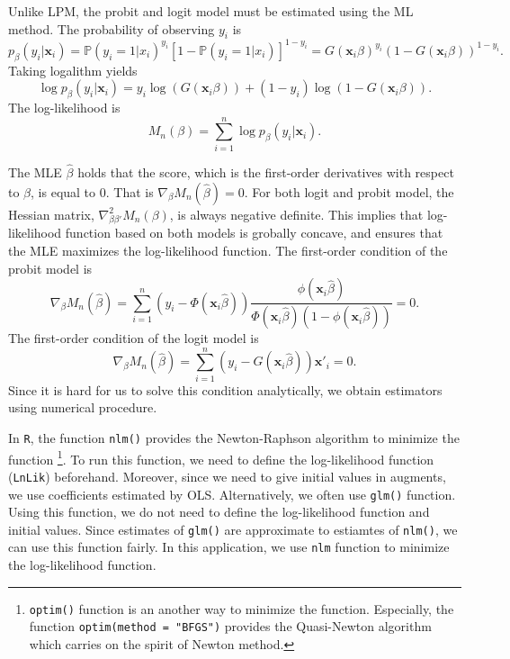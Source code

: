 \documentclass[
  12pt,
]{article}
\begin{document}
Unlike LPM, the probit and logit model must be estimated using the ML
method. The probability of observing \(y_i\) is \begin{equation*}
  p_{\beta}(y_i|\mathbf{x}_i)  
  = \mathbb{P}(y_i = 1 | x_i)^{y_i} [1 - \mathbb{P}(y_i = 1 | x_i)]^{1-y_i}
  = G(\mathbf{x}_i \beta)^{y_i} (1 - G(\mathbf{x}_i \beta))^{1-y_i}.
\end{equation*} Taking logalithm yields \begin{equation*}
  \log p_{\beta}(y_i|\mathbf{x}_i) = y_i \log(G(\mathbf{x}_i \beta)) + (1 - y_i)\log(1 - G(\mathbf{x}_i \beta)).
\end{equation*} The log-likelihood is \begin{equation*}
  M_n(\beta) = \sum_{i=1}^n \log p_{\beta}(y_i|\mathbf{x}_i).
\end{equation*}

The MLE \(\hat{\beta}\) holds that the score, which is the first-order
derivatives with respect to \(\beta\), is equal to 0. That is
\(\nabla_{\beta} M_n(\hat{\beta}) = 0\). For both logit and probit
model, the Hessian matrix, \(\nabla^2_{\beta\beta'} M_n(\beta)\), is
always negative definite. This implies that log-likelihood function
based on both models is grobally concave, and ensures that the MLE
maximizes the log-likelihood function. The first-order condition of the
probit model is \begin{equation*}
  \nabla_{\beta} M_n(\hat{\beta}) 
  = \sum_{i = 1}^n \left( y_i - \Phi(\mathbf{x}_i \hat{\beta}) \right) 
  \frac{\phi(\mathbf{x}_i \hat{\beta})}{\Phi(\mathbf{x}_i \hat{\beta})(1 - \phi(\mathbf{x}_i \hat{\beta}))} = 0.
\end{equation*} The first-order condition of the logit model is
\begin{equation*}
  \nabla_{\beta} M_n(\hat{\beta}) 
  = \sum_{i = 1}^n \left( y_i - G(\mathbf{x}_i \hat{\beta}) \right) \mathbf{x}'_i = 0.
\end{equation*} Since it is hard for us to solve this condition
analytically, we obtain estimators using numerical procedure.

In \texttt{R}, the function \texttt{nlm()} provides the Newton-Raphson
algorithm to minimize the function \footnote{\texttt{optim()} function
  is an another way to minimize the function. Especially, the function
  \texttt{optim(method\ =\ "BFGS")} provides the Quasi-Newton algorithm
  which carries on the spirit of Newton method.}. To run this function,
we need to define the log-likelihood function (\texttt{LnLik})
beforehand. Moreover, since we need to give initial values in augments,
we use coefficients estimated by OLS. Alternatively, we often use
\texttt{glm()} function. Using this function, we do not need to define
the log-likelihood function and initial values. Since estimates of
\texttt{glm()} are approximate to estiamtes of \texttt{nlm()}, we can
use this function fairly. In this application, we use \texttt{nlm}
function to minimize the log-likelihood function.
\end{document}
